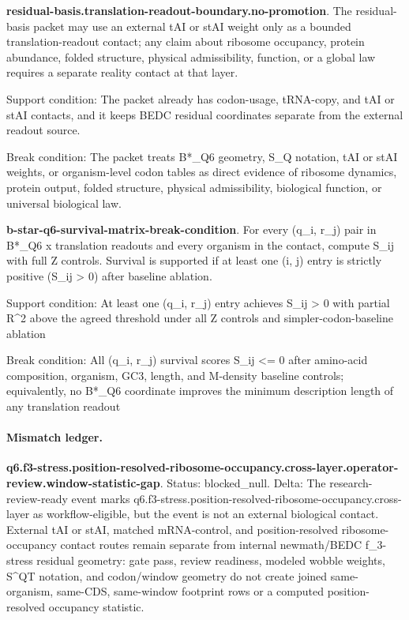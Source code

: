 \textbf{residual-basis.translation-readout-boundary.no-promotion}. The residual-basis packet may use an external tAI or stAI weight only as a bounded translation-readout contact; any claim about ribosome occupancy, protein abundance, folded structure, physical admissibility, function, or a global law requires a separate reality contact at that layer.

Support condition: The packet already has codon-usage, tRNA-copy, and tAI or stAI contacts, and it keeps BEDC residual coordinates separate from the external readout source.

Break condition: The packet treats B*\_Q6 geometry, S\_Q notation, tAI or stAI weights, or organism-level codon tables as direct evidence of ribosome dynamics, protein output, folded structure, physical admissibility, biological function, or universal biological law.

\textbf{b-star-q6-survival-matrix-break-condition}. For every (q\_i, r\_j) pair in B*\_Q6 x translation readouts and every organism in the contact, compute S\_ij with full Z controls. Survival is supported if at least one (i, j) entry is strictly positive (S\_ij > 0) after baseline ablation.

Support condition: At least one (q\_i, r\_j) entry achieves S\_ij > 0 with partial R\textasciicircum{}2 above the agreed threshold under all Z controls and simpler-codon-baseline ablation

Break condition: All (q\_i, r\_j) survival scores S\_ij <= 0 after amino-acid composition, organism, GC3, length, and M-density baseline controls; equivalently, no B*\_Q6 coordinate improves the minimum description length of any translation readout

\paragraph{Mismatch ledger.}
\textbf{q6.f3-stress.position-resolved-ribosome-occupancy.cross-layer.operator-review.window-statistic-gap}. Status: blocked\_null. Delta: The research-review-ready event marks q6.f3-stress.position-resolved-ribosome-occupancy.cross-layer as workflow-eligible, but the event is not an external biological contact. External tAI or stAI, matched mRNA-control, and position-resolved ribosome-occupancy contact routes remain separate from internal newmath/BEDC f\_3-stress residual geometry: gate pass, review readiness, modeled wobble weights, S\textasciicircum{}QT notation, and codon/window geometry do not create joined same-organism, same-CDS, same-window footprint rows or a computed position-resolved occupancy statistic.

